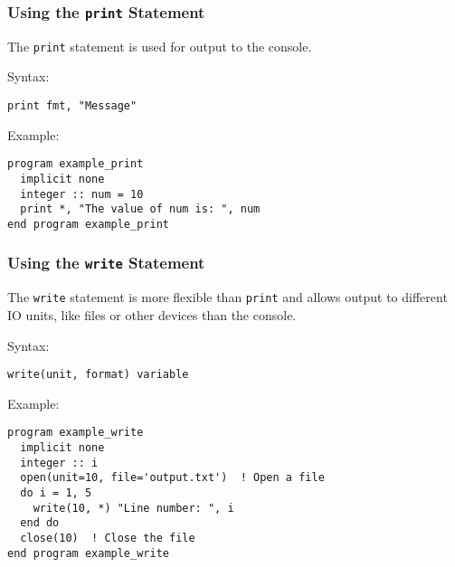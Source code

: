 \begin{frame}[fragile]
  \frametitle{Using the \texttt{print} Statement}
  The \texttt{print} statement is used for output to the console.

  \vspace*{2mm}
  Syntax:
      \begin{lstlisting}
print fmt, "Message"
      \end{lstlisting}

\vspace*{2mm}
  Example:
  \begin{lstlisting}
program example_print
  implicit none
  integer :: num = 10
  print *, "The value of num is: ", num
end program example_print
  \end{lstlisting}
\end{frame}


\begin{frame}[fragile]
  \frametitle{Using the \texttt{write} Statement}
  The \texttt{write} statement is more flexible than \texttt{print} and allows output to different IO units, like files or other devices than the console.

  \vspace*{2mm}
  Syntax:
      \begin{lstlisting}
write(unit, format) variable
      \end{lstlisting}

  \vspace*{2mm}
  Example:
  \begin{lstlisting}
program example_write
  implicit none
  integer :: i
  open(unit=10, file='output.txt')  ! Open a file
  do i = 1, 5
    write(10, *) "Line number: ", i
  end do
  close(10)  ! Close the file
end program example_write
  \end{lstlisting}
\end{frame}



